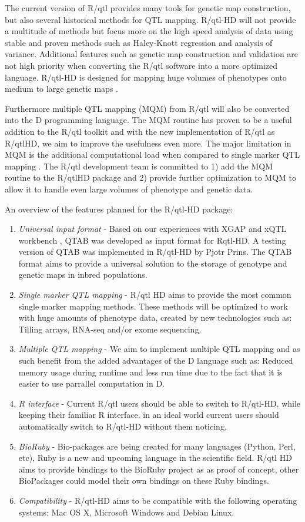 The current version of R/qtl provides many tools for genetic map construction, but also several historical 
methods for QTL mapping. R/qtl-HD will not provide a multitude of methods but focus more on the high speed 
analysis of data using stable and proven methods such as Haley-Knott regression \cite{Haley:1992} and analysis of variance.
Additional features such as genetic map construction and validation are not high priority when converting 
the R/qtl software into a more optimized language. R/qtl-HD is designed for mapping huge volumes of phenotypes 
onto medium to large genetic maps \cite{Trelles:2011}.

Furthermore multiple QTL mapping (MQM) from R/qtl will also be converted into the D programming language.
The MQM routine has proven to be a useful addition to the R/qtl toolkit and with the new implementation 
of R/qtl as R/qtlHD, we aim to improve the usefulness even more. The major limitation in MQM is the 
additional computational load when compared to single marker QTL mapping \cite{Arends:2010}. The R/qtl 
development team is committed to 1) add the MQM routine to the R/qtlHD package and 2) provide further 
optimization to MQM to allow it to handle even large volumes of phenotype and genetic data. 

An overview of the features planned for the R/qtl-HD package:
\begin{enumerate}\itemsep1pt
\item \emph{Universal input format} - Based on our experiences with XGAP \cite{Swertz:2010a} and xQTL workbench 
\cite{Arends:2012}, QTAB was developed as input format for Rqtl-HD. A testing version of QTAB was implemented in 
R/qtl-HD by Pjotr Prins. The QTAB format aims to provide a universal solution to the storage of genotype and genetic 
maps in inbred populations.
\item \emph{Single marker QTL mapping} - R/qtl HD aims to provide the most common single marker mapping methods. 
These methods will be optimized to work with huge amounts of phenotype data, created by new technologies such as: 
Tilling arrays, RNA-seq and/or exome sequencing.
\item \emph{Multiple QTL mapping} - We aim to implement multiple QTL mapping and as such benefit from the added 
advantages of the D language such as: Reduced memory usage during runtime and less run time due to the fact that 
it is easier to use parrallel computation in D.
\item \emph{R interface} - Current R/qtl users should be able to switch to R/qtl-HD, while keeping their familiar 
R interface. in an ideal world current users should automatically switch to R/qtl-HD without them noticing.
\item \emph{BioRuby} - Bio-packages are being created for many languages (Python, Perl, etc), Ruby is a new and 
upcoming language in the scientific field. R/qtl HD aims to provide bindings to the BioRuby project \cite{Goto:2010} 
as as proof of concept, other BioPackages could model their own bindings on these Ruby bindings.
\item \emph{Compatibility} - R/qtl-HD aims to be compatible with the following operating systems: Mac OS X, 
Microsoft Windows and Debian Linux.
\end{enumerate}

